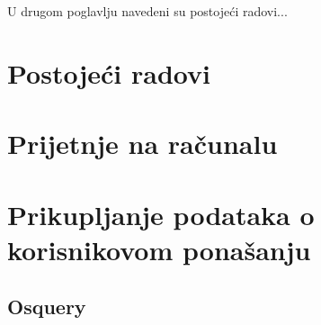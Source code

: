\documentclass[times, utf8, diplomski]{fer}
\begin{document}
U drugom poglavlju navedeni su postojeći radovi...

\chapter{Postojeći radovi}

\chapter{Prijetnje na računalu}

\chapter{Prikupljanje podataka o korisnikovom ponašanju}
\section{Osquery}
\end{document}
